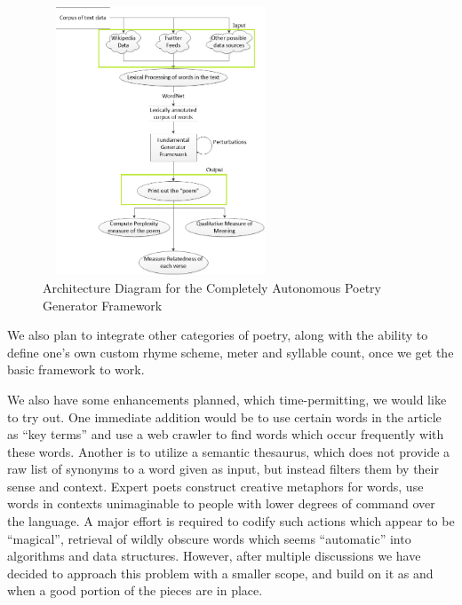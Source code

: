 \documentclass[10pt, letter,twocolumn]{IEEEtran}
\begin{document}
\begin{figure}[ht]
  \centering
    \includegraphics[width=7cm, height=8cm]{Images/arch3}
    \caption{Architecture Diagram for the Completely Autonomous Poetry Generator Framework}
  \label{architecture3}
\end{figure}

We also plan to integrate other categories of poetry, along with the ability to define one's own custom rhyme scheme, meter and syllable count, once we get the basic framework to work.

We also have some enhancements planned, which time-permitting, we would like to try out. One immediate addition would be to use certain words in the article as ``key terms'' and use a web crawler to find words which occur frequently with these words. Another is to utilize a semantic thesaurus, which does not provide a raw list of synonyms to a word given as input, but instead filters them by their sense and context. Expert poets construct creative metaphors for words, use words in contexts unimaginable to people with lower degrees of command over the language. A major effort is required to codify such actions which appear to be  ``magical'', retrieval of wildly obscure words which seems ``automatic'' into algorithms and data structures. However, after multiple discussions we have decided to approach this problem with a smaller scope, and build on it as and when a good portion of the pieces are in place.
\end{document}
